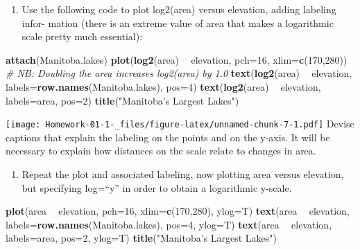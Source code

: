 \documentclass[
]{article}
\newenvironment{Shaded}{\begin{snugshade}}{\end{snugshade}}
\newcommand{\CommentTok}[1]{\textcolor[rgb]{0.56,0.35,0.01}{\textit{#1}}}
\newcommand{\DataTypeTok}[1]{\textcolor[rgb]{0.13,0.29,0.53}{#1}}
\newcommand{\DecValTok}[1]{\textcolor[rgb]{0.00,0.00,0.81}{#1}}
\newcommand{\KeywordTok}[1]{\textcolor[rgb]{0.13,0.29,0.53}{\textbf{#1}}}
\newcommand{\NormalTok}[1]{#1}
\newcommand{\OperatorTok}[1]{\textcolor[rgb]{0.81,0.36,0.00}{\textbf{#1}}}
\newcommand{\StringTok}[1]{\textcolor[rgb]{0.31,0.60,0.02}{#1}}
\providecommand{\tightlist}{%
  \setlength{\itemsep}{0pt}\setlength{\parskip}{0pt}}
\begin{document}
\begin{enumerate}
\def\labelenumi{(\alph{enumi})}
\tightlist
\item
  Use the following code to plot log2(area) versus elevation, adding
  labeling infor- mation (there is an extreme value of area that makes a
  logarithmic scale pretty much essential):
\end{enumerate}

\begin{Shaded}
\begin{Highlighting}[]
\KeywordTok{attach}\NormalTok{(Manitoba.lakes)}
\KeywordTok{plot}\NormalTok{(}\KeywordTok{log2}\NormalTok{(area) }\OperatorTok{~}\StringTok{ }\NormalTok{elevation, }\DataTypeTok{pch=}\DecValTok{16}\NormalTok{, }\DataTypeTok{xlim=}\KeywordTok{c}\NormalTok{(}\DecValTok{170}\NormalTok{,}\DecValTok{280}\NormalTok{))}
\CommentTok{# NB: Doubling the area increases log2(area) by 1.0}
\KeywordTok{text}\NormalTok{(}\KeywordTok{log2}\NormalTok{(area) }\OperatorTok{~}\StringTok{ }\NormalTok{elevation, }\DataTypeTok{labels=}\KeywordTok{row.names}\NormalTok{(Manitoba.lakes), }\DataTypeTok{pos=}\DecValTok{4}\NormalTok{)}
\KeywordTok{text}\NormalTok{(}\KeywordTok{log2}\NormalTok{(area) }\OperatorTok{~}\StringTok{ }\NormalTok{elevation, }\DataTypeTok{labels=}\NormalTok{area, }\DataTypeTok{pos=}\DecValTok{2}\NormalTok{) }
\KeywordTok{title}\NormalTok{(}\StringTok{"Manitoba’s Largest Lakes"}\NormalTok{)}
\end{Highlighting}
\end{Shaded}

\texttt{[image: Homework-01-1-\_files/figure-latex/unnamed-chunk-7-1.pdf]}
Devise captions that explain the labeling on the points and on the
y-axis. It will be necessary to explain how distances on the scale
relate to changes in area.

\begin{enumerate}
\def\labelenumi{(\alph{enumi})}
\setcounter{enumi}{1}
\tightlist
\item
  Repeat the plot and associated labeling, now plotting area versus
  elevation, but specifying log=``y'' in order to obtain a logarithmic
  y-scale.
\end{enumerate}

\begin{Shaded}
\begin{Highlighting}[]
\KeywordTok{plot}\NormalTok{(area }\OperatorTok{~}\StringTok{ }\NormalTok{elevation, }\DataTypeTok{pch=}\DecValTok{16}\NormalTok{, }\DataTypeTok{xlim=}\KeywordTok{c}\NormalTok{(}\DecValTok{170}\NormalTok{,}\DecValTok{280}\NormalTok{), }\DataTypeTok{ylog=}\NormalTok{T)}
\KeywordTok{text}\NormalTok{(area }\OperatorTok{~}\StringTok{ }\NormalTok{elevation, }\DataTypeTok{labels=}\KeywordTok{row.names}\NormalTok{(Manitoba.lakes), }\DataTypeTok{pos=}\DecValTok{4}\NormalTok{, }\DataTypeTok{ylog=}\NormalTok{T)}
\KeywordTok{text}\NormalTok{(area }\OperatorTok{~}\StringTok{ }\NormalTok{elevation, }\DataTypeTok{labels=}\NormalTok{area, }\DataTypeTok{pos=}\DecValTok{2}\NormalTok{, }\DataTypeTok{ylog=}\NormalTok{T) }
\KeywordTok{title}\NormalTok{(}\StringTok{"Manitoba’s Largest Lakes"}\NormalTok{)}
\end{Highlighting}
\end{Shaded}
\end{document}
